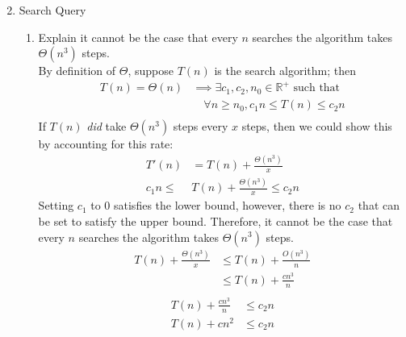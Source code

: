 \documentclass{article}
\begin{document}
\begin{enumerate}
\begin{enumerate}[label=\arabic*.]
\begin{equation*}
                    \end{equation*}
          \end{enumerate}
    \item  Search Query
          \begin{enumerate}[label=\arabic*.]
              \item Explain it cannot be the case that every \(n\) searches the algorithm takes \(\Theta(n^3)\) steps. \\
                    By definition of $\Theta$, suppose \(T(n)\) is the search algorithm; then
                    \begin{align*}
                        T(n) = \Theta(n) & \implies \exists c_1, c_2, n_0 \in \mathbb{R}^+ \text{ such that } \\
                                         & \quad \forall n \geq n_0, c_1n \leq T(n) \leq c_2n                 \\
                    \end{align*}
                    If \(T(n)\) \textit{did} take \(\Theta(n^3)\) steps every \(x\) steps, then we could show this by accounting for this rate:
                    \begin{align*}
                        T'(n)     & = T(n) + \frac{\Theta(n^3)}{x}          \\
                        c_1n \leq & T(n) +  \frac{\Theta(n^3)}{x} \leq c_2n
                    \end{align*}
                    Setting \(c_1\) to 0 satisfies the lower bound, however, there is no \(c_2\) that can be set to satisfy the upper bound. Therefore, it cannot be the case that every \(n\) searches the algorithm takes \(\Theta(n^3)\) steps.
                    \begin{align*}
                        T(n) +  \frac{\Theta(n^3)}{x} & \leq T(n) + \frac{O(n^3)}{n} \\
                                                      & \leq T(n) + \frac{cn^3}{n}   \\
                    \end{align*}
                    \vspace*{-3.5em}
                    \begin{align*}
                        T(n) + \frac{cn^3}{n} & \leq c_2n \\
                        T(n) + cn^2           & \leq c_2n \\
                    \end{align*}

\end{enumerate}
\end{enumerate}
\end{document}
